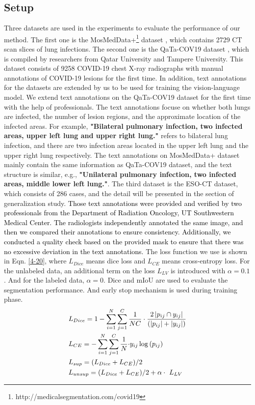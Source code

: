 \documentclass[lettersize,journal]{IEEEtran}
\begin{document}
\subsection{Setup}
Three datasets are used in the experiments to evaluate the performance of our method. The first one is the \renewcommand{\thefootnote}{\arabic{footnote}}{MosMedData+\footnote{http://medicalsegmentation.com/covid19}} dataset \cite{morozov2020mosmeddata,hofmanninger2020automatic}, which contains 2729 CT scan slices of lung infections. The second one is the QaTa-COV19 dataset \cite{48degerli2022osegnet}, which is compiled by researchers from Qatar University and Tampere University. This dataset consists of 9258 COVID-19 chest X-ray radiographs with manual annotations of COVID-19 lesions for the first time. In addition, text annotations for the datasets are extended by us to be used for training the vision-language model. We extend text annotations on the QaTa-COV19 dataset for the first time with the help of professionals. The text annotations focuse on whether both lungs are infected, the number of lesion regions, and the approximate location of the infected areas. 
For example, \textbf{"Bilateral pulmonary infection, two infected areas, upper left lung and upper right lung."} refers to bilateral lung infection, and there are two infection areas located in the upper left lung and the upper right lung respectively. 
The text annotations on MosMedData+ dataset mainly contain the same information as QaTa-COV19 dataset, and the text structure is similar, e.g., \textbf{"Unilateral pulmonary infection, two infected areas, middle lower left lung."}. 
The third dataset is the ESO-CT dataset, which consists of 286 cases, and the detail will be presented in the section of generalization study.
\textcolor{black}{
Those text annotations were provided and verified by two professionals from the Department of Radiation Oncology, UT Southwestern Medical Center. The radiologists independently annotated the same image, and then we compared their annotations to ensure consistency. Additionally, we conducted a quality check based on the provided mask to ensure that there was no excessive deviation in the text annotations.}
The loss function we use is shown in Eqn. \ref{4-20}, where $L_{Dice}$ means dice loss and $L_{CE}$ means cross-entropy loss. For the unlabeled data, an additional term on the loss $L_{LV}$ is introduced with $\alpha=0.1$. And for the labeled data, $\alpha=0$.
Dice and mIoU are used to evaluate the segmentation performance. And early stop mechanism is used during training phase.
\begin{eqnarray}
\setlength{\belowdisplayskip}{3pt}
&L_{Dice}=1-\sum_{i=1}^{N}\sum_{j=1}^{C}{\frac{1}{NC}\cdot\frac{2\left|p_{ij}\cap y_{ij}\right|}{\left(\left|p_{ij}\right|+\left|y_{ij}\right|\right)}}
\label{4-17}
\\
&L_{CE}=-\sum_{i=1}^{N}\sum_{j=1}^{C}{\frac{1}{N}\cdot}y_{ij}\log{\left(p_{ij}\right)}
\label{4-18}
\\
&L_{sup}=(L_{Dice}+L_{CE})/2
\label{4-19}
\\
&L_{unsup}=(L_{Dice}+L_{CE})/2+\alpha\cdot\ L_{LV}\ 
\label{4-20}
\setlength{\abovedisplayskip}{3pt}
\end{eqnarray}
\end{document}
